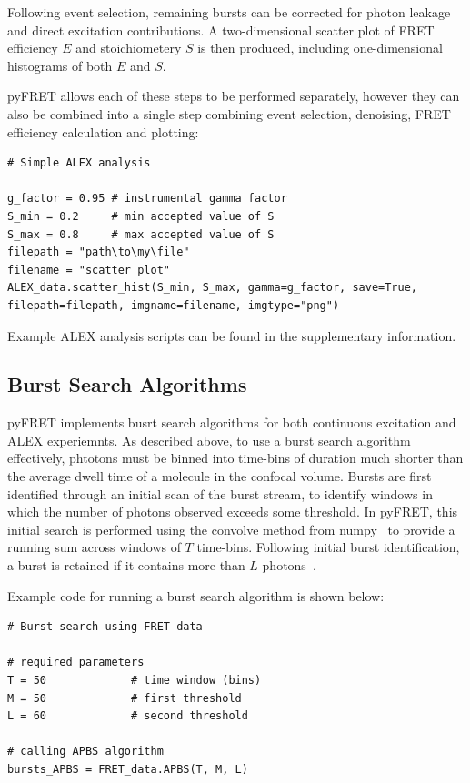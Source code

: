 Following event selection, remaining bursts can be corrected for photon leakage and direct excitation contributions. A two-dimensional scatter plot of FRET efficiency $E$ and stoichiometery $S$ is then produced, including one-dimensional histograms of both $E$ and $S$. 

pyFRET allows each of these steps to be performed separately, however they can also be combined into a single step combining event selection, denoising, FRET efficiency calculation and plotting:

\begin{lstlisting}
# Simple ALEX analysis

g_factor = 0.95 # instrumental gamma factor
S_min = 0.2     # min accepted value of S
S_max = 0.8     # max accepted value of S
filepath = "path\to\my\file"
filename = "scatter_plot"
ALEX_data.scatter_hist(S_min, S_max, gamma=g_factor, save=True, filepath=filepath, imgname=filename, imgtype="png")
\end{lstlisting}

Example ALEX analysis scripts can be found in the supplementary information.

\subsection{Burst Search Algorithms}
pyFRET implements busrt search algorithms for both continuous excitation and ALEX experiemnts. As described above, to use a burst search algorithm effectively, phtotons must be binned into time-bins of duration much shorter than the average dwell time of a molecule in the confocal volume. Bursts are first identified through an initial scan of the burst stream, to identify windows in which the number of photons observed exceeds some threshold. In pyFRET, this initial search is performed using the convolve method from numpy~\cite{numpy11} to provide a running sum across windows of $T$ time-bins. Following initial burst identification, a burst is retained if it contains more than $L$ photons~\cite{nir06}.

Example code for running a burst search algorithm is shown below:

\begin{lstlisting}
# Burst search using FRET data

# required parameters
T = 50             # time window (bins)
M = 50             # first threshold
L = 60             # second threshold

# calling APBS algorithm
bursts_APBS = FRET_data.APBS(T, M, L)
\end{lstlisting}

